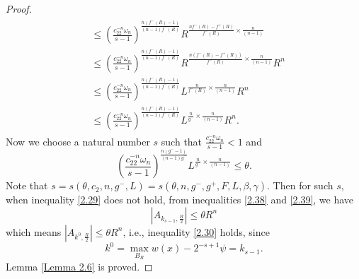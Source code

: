 \documentclass[10pt,a4paper]{amsart}
\begin{document}
\begin{proof}
\begin{align}
\begin{split}
&\leq \left(\frac{c_22^{-n}\omega_n}{s - 1}\right)^{\frac{n(f^-(R) - 1)}{(n-1)f^-(R)}} R^{\frac{nf^-(R)-f^+(R)}{f^-(R)}\times\frac{n}{(n-1)}}\\
& \leq  \left(\frac{c_22^{-n}\omega_n}{s - 1}\right)^{\frac{n(f^-(R) - 1)}{(n-1)f^-(R)}} R^{\frac{n\left(f^-(R)-f^+(R)\right)}{f^-(R)}\times\frac{n}{(n-1)}} R^n\\
& \leq  \left(\frac{c_22^{-n}\omega_n}{s - 1}\right)^{\frac{n(f^-(R) - 1)}{(n-1)f^-(R)}} L^{\frac{n}{f^-(R)}\times\frac{n}{(n-1)}} R^n\\
& \leq  \left(\frac{c_22^{-n}\omega_n}{s - 1}\right)^{\frac{n(f^-(R) - 1)}{(n-1)f^-(R)}} L^{\frac{n}{g^-}\times\frac{n}{(n-1)}} R^n.
\end{split}
\end{align}
Now we choose a natural number \(s\) such that \(\frac{c_22^{-n}\omega_n}{s - 1}<1\) and
\begin{equation}\label{2.39}
\left(\frac{c_22^{-n}\omega_n}{s - 1}\right)^{\frac{n(g^- - 1)}{(n-1)g^-}} L^{\frac{n}{g^-}\times\frac{n}{(n-1)}}\leq \theta.
\end{equation}
Note that \(s = s(\theta, c_2, n, g^-,L) = s(\theta,n,g^-,g^+,F,L,\beta,\gamma)\). Then for such \(s\), when inequality \eqref{2.29} does not hold, from inequalities \eqref{2.38} and \eqref{2.39}, we have
\[
|A_{k_{s-1}, \frac{R}{2}}| \leq \theta R^n
\]
which means \(|A_{k^0, \frac{R}{2}}| \leq \theta R^n\), i.e., inequality \eqref{2.30} hol{\rm d}s, since
\[
k^0 = \max_{B_R} w(x) - 2^{-s+1}\psi = k_{s-1}.
\]
Lemma \ref{Lemma 2.6} is proved.
\end{proof}
\end{document}
